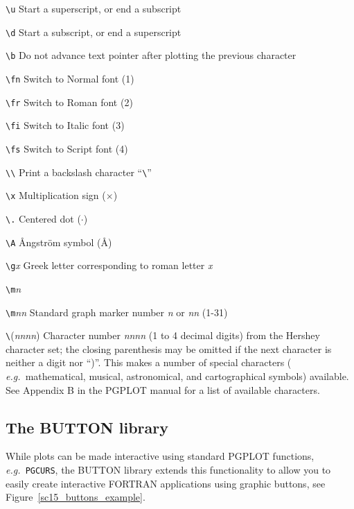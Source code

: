 \documentclass[twoside,11pt]{article}
\newcommand{\htmladdnormallink}[2]{#1}
\newcommand{\xlabel}[1]{}
\begin{document}
\begin{description}

\item \verb*|\u| Start a superscript, or end a subscript
\item \verb*|\d| Start a subscript, or end a superscript
\item \verb*|\b| Do not advance text pointer after plotting the previous character
\item \verb*|\fn| Switch to  Normal font (1)
\item \verb*|\fr| Switch to Roman font (2)
\item \verb*|\fi| Switch to Italic font (3)
\item \verb*|\fs| Switch to Script font (4)
\item \verb*|\\| Print a backslash character ``\verb*|\|''
\item \verb*|\x|  Multiplication sign ($\times$)
\item \verb*|\.| Centered dot ($\cdot$)
\item \verb*|\A| {\rm \AA}ngstr\"{o}m symbol ({\rm \AA})
\item \verb*|\g|{\em x} Greek letter corresponding to roman letter {\em x}
\item \verb*|\m|{\em n}
\item \verb*|\m|{\em nn} Standard graph marker number {\em n} or {\em nn} (1-31)

\item \verb*|\|({\em nnnn}) Character number {\em nnnn} (1 to 4
      decimal digits) from the Hershey character set; the closing
      parenthesis may be omitted if the next character is neither a
      digit nor ``)''. This makes a number of special characters ({\em
      e.g.\ }mathematical, musical, astronomical, and cartographical
      symbols) available. See \htmladdnormallink{Appendix
      B}{http://astro.caltech.edu/~tjp/pgplot/hershey.html} in the
      PGPLOT manual for a list of available characters.

\end{description}

\subsection{\xlabel{sc15_pgbut}The BUTTON library\label{sc15_pgbut}}

While plots can be made interactive using standard PGPLOT functions,
{\em e.g.\ }{\tt PGCURS}, the
\htmladdnormallink{BUTTON}{http://www.ucm.es/info/Astrof/button/button.html}
library extends this functionality to allow you to easily create
interactive FORTRAN applications using graphic buttons, see
Figure~\ref{sc15_buttons_example}.
\end{document}
